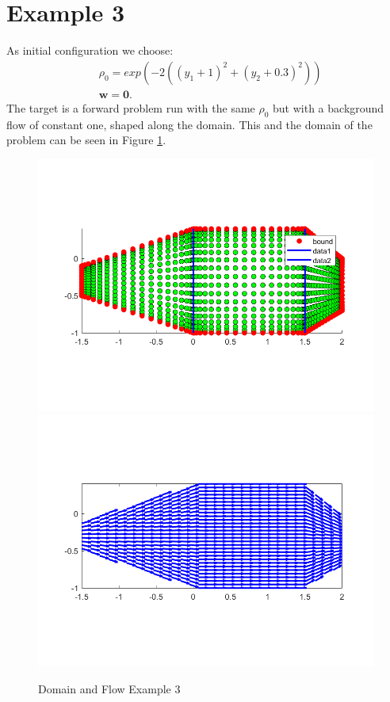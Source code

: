 \documentclass[11pt, a4paper]{article}
\theoremstyle{definition}
\newcommand{\w}{\mathbf{w}}
\begin{document}
\section{Example 3}
As initial configuration we choose:
\begin{align*}
&\rho_0 = exp(-2((y_1 + 1)^2 + (y_2 + 0.3)^2))\\
&\w = \mathbf{0}.
\end{align*}	
The target is a forward problem run with the same $\rho_0$ but with a background flow of constant one, shaped along the domain. This and the domain of the problem can be seen in Figure \ref{Dom3}.
\begin{figure}[h]
	\centering
	\includegraphics[scale=0.4]{Dom3.png}
	\includegraphics[scale=0.4]{Flow3.png}
	\caption{Domain and Flow Example 3} 
	\label{Dom3}
\end{figure}	
	
\end{document}
